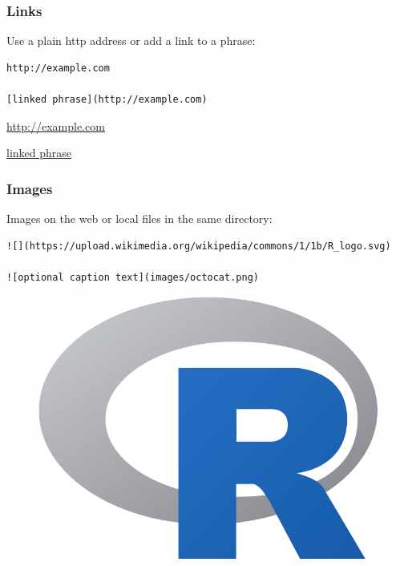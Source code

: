 \documentclass[]{book}
\theoremstyle{definition}
\theoremstyle{definition}
\theoremstyle{definition}
\theoremstyle{remark}
\begin{document}
\subsubsection{Links}\label{links}

Use a plain http address or add a link to a phrase:

\begin{verbatim}
http://example.com

[linked phrase](http://example.com)
\end{verbatim}

\url{http://example.com}

\href{http://example.com}{linked phrase}

\subsubsection{Images}\label{images}

Images on the web or local files in the same directory:

\begin{verbatim}
![](https://upload.wikimedia.org/wikipedia/commons/1/1b/R_logo.svg)

![optional caption text](images/octocat.png)
\end{verbatim}

\begin{figure}
\centering
\includegraphics{images/R_logo.png}
\caption{}
\end{figure}
\end{document}
